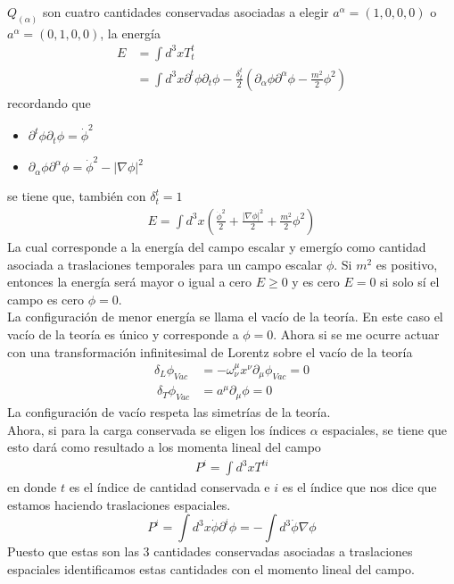 \documentclass[../main.tex]{subfiles}
\begin{document}
$Q_{(\alpha)}$ son cuatro cantidades conservadas asociadas a elegir $a^\alpha = (1,0,0,0)$ o $a^\alpha=(0,1,0,0)$, la energía
\begin{align*}
  E & = \int d^3xT^t_t \\
  & = \int d^3 x \partial^t\phi \partial_t\phi - \frac{\delta_t^t}{2}\left( \partial_\alpha \phi \partial^\alpha \phi - \frac{m^2}{2}\phi^2 \right)
\end{align*}
recordando que
\begin{itemize}
  \item $\partial^t\phi \partial_t\phi = \dot{\phi}^2$ 
  \item $\partial_\alpha \phi \partial^\alpha \phi = \dot{\phi}^2 - |\nabla\phi|^2$
\end{itemize}
se tiene que, también con $\delta_t^t=1$
\begin{align}
  \boxed{  E  = \int d^3x \left( \frac{\dot{\phi}^2}{2} + \frac{|\nabla\phi|^2}{2} + \frac{m^2}{2}\phi^2 \right)}
\end{align}
La cual corresponde a la energía del campo escalar y emergío como cantidad asociada a traslaciones temporales para un campo escalar $\phi$. Si $m^2$ es positivo, entonces la energía será mayor o igual a cero $E\geq 0$ y es cero $E=0$ si solo sí el campo es cero $\phi=0$. \\
La configuración de menor energía se llama el vacío de la teoría. En este caso el vacío de la teoría es único y corresponde a $\phi=0$. Ahora si se me ocurre actuar con una transformación infinitesimal de Lorentz sobre el vacío de la teoría
\begin{align*}
  \delta_L \phi_{Vac} & = -\omega^\mu_\nu x^\nu \partial_\mu \phi_{Vac} = 0 \\\
  \delta_T \phi_{Vac} & = a^\mu\partial_\mu \phi = 0
\end{align*}
La configuración de vacío respeta las simetrías de la teoría. \\
Ahora, si para la carga conservada se eligen los índices $\alpha$ espaciales, se tiene que esto dará como resultado a los momenta lineal del campo 
\begin{align*}
  P^i = \int d^3x T^{ti}
\end{align*}
en donde $t$ es el índice de cantidad conservada e $i$ es el índice que nos dice que estamos haciendo traslaciones espaciales.
\begin{equation*}
  P^i = \int d^3x \dot{\phi}\partial^i\phi = -\int d^3 \dot{\phi}\nabla \phi
\end{equation*}
Puesto que estas son las 3 cantidades conservadas asociadas a traslaciones espaciales identificamos estas cantidades con el momento lineal del campo. 
\end{document}
